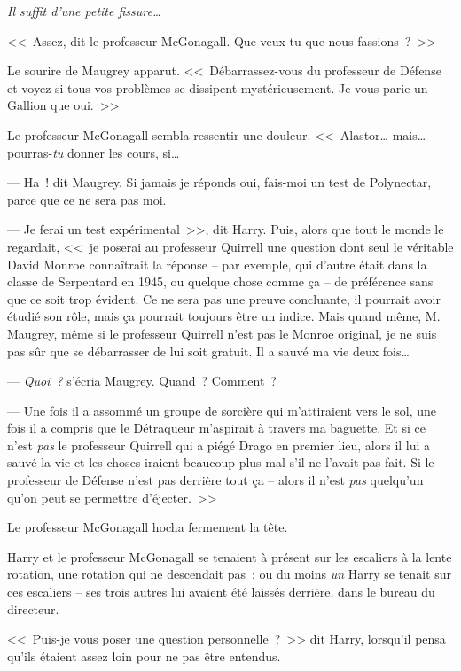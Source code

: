\emph{Il suffit d'une petite fissure…}

<<~Assez, dit le professeur McGonagall. Que veux-tu que nous fassions~?~>>

Le sourire de Maugrey apparut. <<~Débarrassez-vous du professeur de Défense et voyez si tous vos problèmes se dissipent mystérieusement. Je vous parie un Gallion que oui.~>>

Le professeur McGonagall sembla ressentir une douleur.
<<~Alastor… mais… pourras-\emph{tu} donner les cours, si…

--- Ha~! dit Maugrey. Si jamais je réponds oui, fais-moi un test de Polynectar, parce que ce ne sera pas moi.

--- Je ferai un test expérimental~>>, dit Harry. Puis, alors que tout le monde le regardait, <<~je poserai au professeur Quirrell une question dont seul le véritable David Monroe connaîtrait la réponse -- par exemple, qui d'autre était dans la classe de Serpentard en 1945, ou quelque chose comme ça -- de préférence sans que ce soit trop évident. Ce ne sera pas une preuve concluante, il pourrait avoir étudié son rôle, mais ça pourrait toujours être un indice. Mais quand même, M. Maugrey, même si le professeur Quirrell n'est pas le Monroe original, je ne suis pas sûr que se débarrasser de lui soit gratuit. Il a sauvé ma vie deux fois…

--- \emph{Quoi~?} s'écria Maugrey. Quand~? Comment~?

--- Une fois il a assommé un groupe de sorcière qui m'attiraient vers le sol, une fois il a compris que le Détraqueur m'aspirait à travers ma baguette. Et si ce n'est \emph{pas} le professeur Quirrell qui a piégé Drago en premier lieu, alors il lui a sauvé la vie et les choses iraient beaucoup plus mal s'il ne l'avait pas fait. Si le professeur de Défense n'est pas derrière tout ça -- alors il n'est \emph{pas} quelqu'un qu'on peut se permettre d'éjecter.~>>

Le professeur McGonagall hocha fermement la tête.


Harry et le professeur McGonagall se tenaient à présent sur les escaliers à la lente rotation, une rotation qui ne descendait pas~; ou du moins \emph{un} Harry se tenait sur ces escaliers -- ses trois autres lui avaient été laissés derrière, dans le bureau du directeur.

<<~Puis-je vous poser une question personnelle~?~>> dit Harry, lorsqu'il pensa qu'ils étaient assez loin pour ne pas être entendus.


